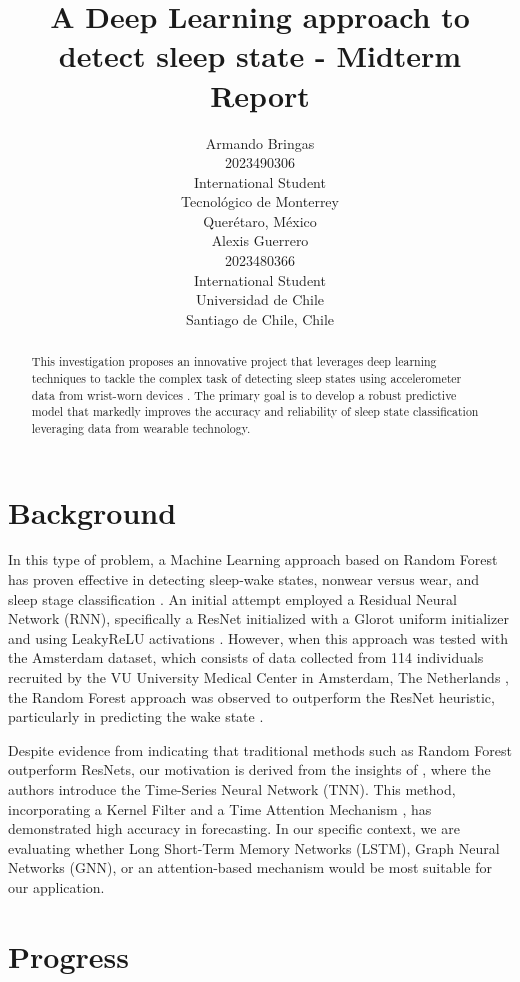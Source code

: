 \documentclass{article}
\title{A Deep Learning approach to detect sleep state - Midterm Report}
\author{%
  Armando Bringas \\
  2023490306 \\
  International Student \\
  Tecnológico de Monterrey \\
  Querétaro, México \\
  \And
  Alexis Guerrero \\
  2023480366 \\
  International Student \\
  Universidad de Chile \\
  Santiago de Chile, Chile \\
}
\begin{document}
\maketitle





\begin{abstract}
This investigation proposes an innovative project that leverages deep learning techniques to tackle the complex task of detecting sleep states using accelerometer data from wrist-worn devices \cite{child-mind-institute-detect-sleep-states}. The primary goal is to develop a robust predictive model that markedly improves the accuracy and reliability of sleep state classification leveraging data from wearable technology.
\end{abstract}


\section{Background}

In this type of problem, a Machine Learning approach based on Random Forest has proven effective in detecting sleep-wake states, nonwear versus wear, and sleep stage classification \cite{Sundararajan2021}. An initial attempt employed a Residual Neural Network (RNN), specifically a ResNet initialized with a Glorot uniform initializer and using LeakyReLU activations \cite{Sundararajan2021}. However, when this approach was tested with the Amsterdam dataset, which consists of data collected from 114 individuals recruited by the VU University Medical Center in Amsterdam, The Netherlands \cite{teLindert2020}, the Random Forest approach was observed to outperform the ResNet heuristic, particularly in predicting the wake state \cite{Sundararajan2021}.

Despite evidence from \cite{Sundararajan2021} indicating that traditional methods such as Random Forest outperform ResNets, our motivation is derived from the insights of \cite{Zhang2023}, where the authors introduce the Time-Series Neural Network (TNN). This method, incorporating a Kernel Filter and a Time Attention Mechanism \cite{Zhang2023}, has demonstrated high accuracy in forecasting. In our specific context, we are evaluating whether Long Short-Term Memory Networks (LSTM), Graph Neural Networks (GNN), or an attention-based mechanism would be most suitable for our application.

\section{Progress}
\end{document}

